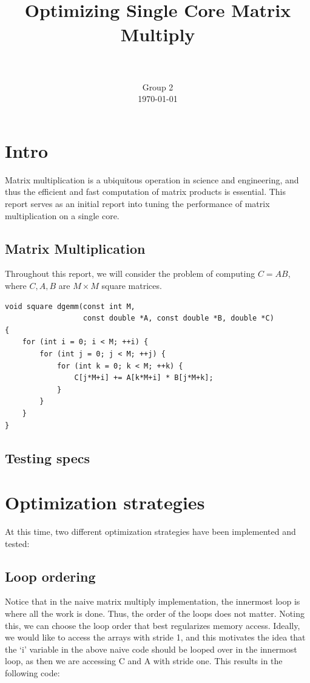 \documentclass[paper=a4, fontsize=11pt]{scrartcl}
\title{
        \usefont{OT1}{bch}{b}{n}
        \horrule{0.5pt} \\[0.4cm]
        \huge Optimizing Single Core Matrix Multiply \\
        \horrule{2pt} \\[0.5cm]
}
\author{
        \normalfont                                 \normalsize
        Group 2\\[-3pt]      \normalsize
        \today
}
\date{}
\numberwithin{equation}{section}        %
\numberwithin{figure}{section}          %
\numberwithin{table}{section}               %
\begin{document}
\maketitle

\section{Intro}
Matrix multiplication is a ubiquitous operation in science and engineering,
and thus the efficient and fast computation of matrix products is essential.
This report serves as an initial report into tuning the performance of matrix
multiplication on a single core.

\subsection{Matrix Multiplication}
Throughout this report, we will consider the problem of computing
$C = A B$, where $C, A, B$ are $M \times M$ square matrices.

\begin{lstlisting}[frame = single, caption={Naive Square Matrix Multiply}]
void square dgemm(const int M, 
                  const double *A, const double *B, double *C)
{
    for (int i = 0; i < M; ++i) {
        for (int j = 0; j < M; ++j) {
            for (int k = 0; k < M; ++k) {
                C[j*M+i] += A[k*M+i] * B[j*M+k];
            }
        }
    }
}
\end{lstlisting}

\subsection{Testing specs}

\section{Optimization strategies}

At this time, two different optimization strategies have been implemented and
tested: 

\subsection{Loop ordering}
Notice that in the naive matrix multiply implementation, the innermost loop
is where all the work is done.  Thus, the order of the loops does not matter.
Noting this, we can choose the loop order that best regularizes memory access.
Ideally, we would like to access the arrays with stride 1, and this motivates the
idea that the `i' variable in the above naive code should be looped over in the 
innermost loop, as then we are accessing C and A with stride one.  This results in 
the following code:
\end{document}
